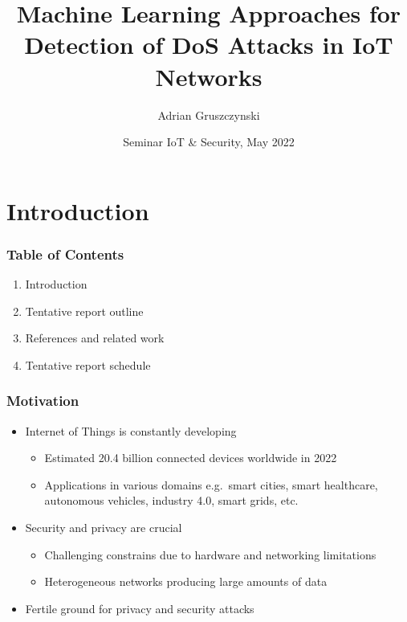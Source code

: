 \documentclass[10pt, presentation]{beamer}
\title[Machine Learning Approaches for Detection of DoS Attacks in IoT Networks] %
{Machine Learning Approaches for Detection of DoS Attacks in IoT Networks}
\subtitle{}
\author[Adrian Gruszczynski] %
{Adrian Gruszczynski}
\institute[Freie Universität Berlin] %
{
  Institute of Computer Science\\
  Freie Universität Berlin
}
\date[2022] %
{Seminar IoT \& Security, May 2022}
\begin{document}
\frame{\titlepage}
%
%
%
\section{Introduction}
    \begin{frame}
        \frametitle{Table of Contents}
        \begin{enumerate}
            \item Introduction
            \item Tentative report outline
            \item References and related work
            \item Tentative report schedule
        \end{enumerate}
    \end{frame}

\begin{frame}
\frametitle{Motivation}
  \begin{itemize}
    \item Internet of Things is constantly developing
      \begin{itemize}
          \item Estimated 20.4 billion connected devices worldwide in 2022\ \cite{WEBSITE:1}
          \item Applications in various domains e.g.\ smart cities, smart healthcare, autonomous vehicles, industry 4.0, smart grids, etc.
      \end{itemize}
      \item Security and privacy are crucial
      \begin{itemize}
          \item Challenging constrains due to hardware and networking limitations
          \item Heterogeneous networks producing large amounts of data
      \end{itemize}
    \item Fertile ground for privacy and security attacks
  \end{itemize}
\end{frame}
\end{document}
